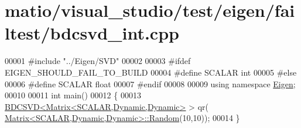 \hypertarget{matio_2visual__studio_2test_2eigen_2failtest_2bdcsvd__int_8cpp_source}{}\section{matio/visual\+\_\+studio/test/eigen/failtest/bdcsvd\+\_\+int.cpp}
\label{matio_2visual__studio_2test_2eigen_2failtest_2bdcsvd__int_8cpp_source}

\begin{DoxyCode}
00001 \textcolor{preprocessor}{#include "../Eigen/SVD"}
00002 
00003 \textcolor{preprocessor}{#ifdef EIGEN\_SHOULD\_FAIL\_TO\_BUILD}
00004 \textcolor{preprocessor}{#define SCALAR int}
00005 \textcolor{preprocessor}{#else}
00006 \textcolor{preprocessor}{#define SCALAR float}
00007 \textcolor{preprocessor}{#endif}
00008 
00009 \textcolor{keyword}{using namespace }\hyperlink{namespace_eigen}{Eigen};
00010 
00011 \textcolor{keywordtype}{int} main()
00012 \{
00013   \hyperlink{group___s_v_d___module_class_eigen_1_1_b_d_c_s_v_d}{BDCSVD<Matrix<SCALAR,Dynamic,Dynamic>} > qr(
      \hyperlink{group___core___module_class_eigen_1_1_matrix}{Matrix<SCALAR,Dynamic,Dynamic>::Random}(10,10));
00014 \}
\end{DoxyCode}
